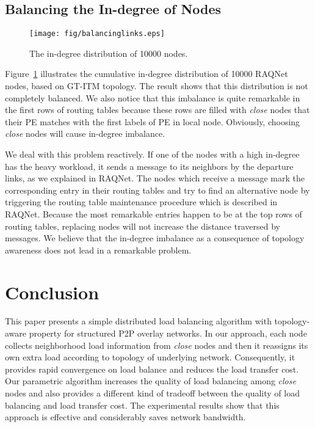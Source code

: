 \documentclass {article}
\begin{document}
\subsection{Balancing  the In-degree of  Nodes}\label{Loadbalancelinks}
\begin{figure}[t]
\hspace{0.5cm}
\texttt{[image: fig/balancinglinks.eps]}
\caption{The in-degree distribution of 10000 nodes. }
\label{fig:load1}
\end{figure}
Figure~\ref{fig:load1} illustrates the cumulative in-degree distribution  of 10000 RAQNet nodes,
based on GT-ITM topology. The result shows that this distribution is not completely balanced.
We also notice that this imbalance is quite remarkable in the first rows of routing tables because these
rows are filled with  \emph{close} nodes that their PE matches with the first labels of PE in local node. Obviously, choosing  \emph{close} nodes will cause  in-degree imbalance.

We deal with this problem reactively.
If one of the nodes with a high in-degree has the heavy  workload, it sends a  message to
its neighbors by the departure links, as we explained in RAQNet. The nodes which receive a 
message mark the corresponding entry in their routing tables and try to find an alternative node by triggering the routing table maintenance procedure which is described in RAQNet. Because the most remarkable entries happen to be at the top rows of routing tables, replacing nodes will not increase the  distance traversed by messages.
We believe that the in-degree imbalance as a consequence of topology awareness does not lead in a remarkable problem.
\section{Conclusion}\label{Concsec}
This paper presents a simple distributed  load balancing algorithm with topology-aware property for structured P2P overlay networks.
In our approach, each node collects neighborhood load information from  \emph{close}  nodes and then it reassigns  its own extra load according to topology of underlying network. Consequently, it provides rapid convergence on load balance and reduces the load transfer cost.
Our parametric algorithm  increases the quality of load balancing among \emph{close} nodes and also  provides
a different kind of tradeoff between the quality of load balancing and load transfer cost. The experimental results show that this approach is effective and  considerably saves network bandwidth.
\end{document}
